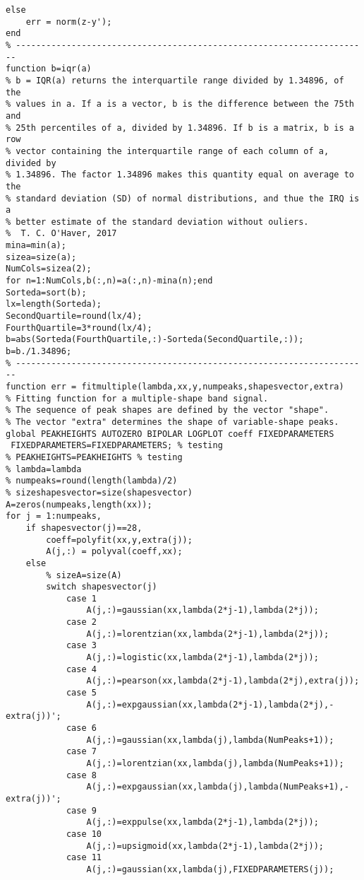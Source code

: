 \begin{lstlisting}
else
    err = norm(z-y');
end
% ----------------------------------------------------------------------
function b=iqr(a)
% b = IQR(a) returns the interquartile range divided by 1.34896, of the
% values in a. If a is a vector, b is the difference between the 75th and
% 25th percentiles of a, divided by 1.34896. If b is a matrix, b is a row
% vector containing the interquartile range of each column of a, divided by
% 1.34896. The factor 1.34896 makes this quantity equal on average to the
% standard deviation (SD) of normal distributions, and thue the IRQ is a
% better estimate of the standard deviation without ouliers.
%  T. C. O'Haver, 2017
mina=min(a);
sizea=size(a);
NumCols=sizea(2);
for n=1:NumCols,b(:,n)=a(:,n)-mina(n);end
Sorteda=sort(b);
lx=length(Sorteda);
SecondQuartile=round(lx/4);
FourthQuartile=3*round(lx/4);
b=abs(Sorteda(FourthQuartile,:)-Sorteda(SecondQuartile,:));
b=b./1.34896;
% ----------------------------------------------------------------------
function err = fitmultiple(lambda,xx,y,numpeaks,shapesvector,extra)
% Fitting function for a multiple-shape band signal.
% The sequence of peak shapes are defined by the vector "shape".
% The vector "extra" determines the shape of variable-shape peaks.
global PEAKHEIGHTS AUTOZERO BIPOLAR LOGPLOT coeff FIXEDPARAMETERS
 FIXEDPARAMETERS=FIXEDPARAMETERS; % testing
% PEAKHEIGHTS=PEAKHEIGHTS % testing
% lambda=lambda
% numpeaks=round(length(lambda)/2)
% sizeshapesvector=size(shapesvector)
A=zeros(numpeaks,length(xx));
for j = 1:numpeaks,
    if shapesvector(j)==28,
        coeff=polyfit(xx,y,extra(j));
        A(j,:) = polyval(coeff,xx);
    else
        % sizeA=size(A)
        switch shapesvector(j)
            case 1
                A(j,:)=gaussian(xx,lambda(2*j-1),lambda(2*j));
            case 2
                A(j,:)=lorentzian(xx,lambda(2*j-1),lambda(2*j));
            case 3
                A(j,:)=logistic(xx,lambda(2*j-1),lambda(2*j));
            case 4
                A(j,:)=pearson(xx,lambda(2*j-1),lambda(2*j),extra(j));
            case 5
                A(j,:)=expgaussian(xx,lambda(2*j-1),lambda(2*j),-extra(j))';
            case 6
                A(j,:)=gaussian(xx,lambda(j),lambda(NumPeaks+1));
            case 7
                A(j,:)=lorentzian(xx,lambda(j),lambda(NumPeaks+1));
            case 8
                A(j,:)=expgaussian(xx,lambda(j),lambda(NumPeaks+1),-extra(j))';
            case 9
                A(j,:)=exppulse(xx,lambda(2*j-1),lambda(2*j));
            case 10
                A(j,:)=upsigmoid(xx,lambda(2*j-1),lambda(2*j));
            case 11
                A(j,:)=gaussian(xx,lambda(j),FIXEDPARAMETERS(j));

\end{lstlisting}
